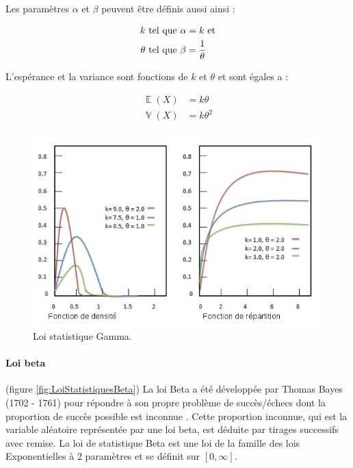 \documentclass[a4paper,12pt]{report}
\DeclareMathOperator{\E}{\mathbb{E}} %
\DeclareMathOperator{\V}{\mathbb{V}} %
\theoremstyle{plain}				%
\theoremstyle{definition}				%
\begin{document}
Les paramètres $\alpha$ et $\beta$ peuvent être définis aussi ainsi :

   
\begin{align*}
   k 		& \textnormal{ tel que } \alpha = k  \textnormal{ et} \\
   \theta 	& \textnormal{ tel que } \beta  = \frac{1}{\theta}
\end{align*}

L’espérance et la variance sont fonctions de $k$ et $\theta$ et sont égales a :

\begin{align*}
	\E(X) &= k \theta \\
	\V(X) &= k \theta ^2
\end{align*}

\begin{figure}
{\centering
\includegraphics[width=\columnwidth]{loiStatGamma.png}
\caption{Loi statistique Gamma.}
\label{fig:LoiStatistiquesGamma}
\par}
\end{figure}

\paragraph{Loi beta} (figure \ref{fig:LoiStatistiquesBeta})
La loi Beta a été développée par Thomas Bayes (1702 - 1761) pour répondre à son propre problème 
  de succès/échecs dont la proportion de succès possible est inconnue \cite{bayes1991essay}. Cette proportion inconnue, qui est la variable aléatoire représentée par une loi beta, est déduite par tirages successifs avec remise. 
La loi de statistique Beta est une loi de la famille des lois Exponentielles à 2 paramètres et se définit 
  sur $[0, \infty]$. 
 
\end{document}
